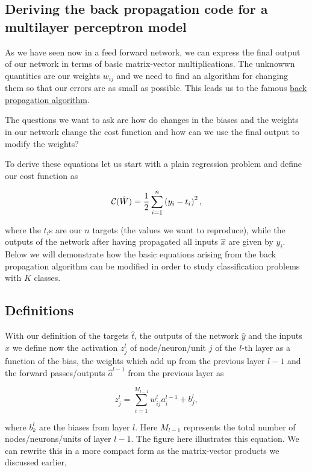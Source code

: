 \documentclass[%
oneside,                 %
final,                   %
10pt]{article}
\begin{document}
\subsection{Deriving the back propagation code for a multilayer perceptron model}

As we have seen now in a feed forward network, we can express the final output of our network in terms of basic matrix-vector multiplications.
The unknowwn quantities are our weights $w_{ij}$ and we need to find an algorithm for changing them so that our errors are as small as possible.
This leads us to the famous \href{{https://www.nature.com/articles/323533a0}}{back propagation algorithm}.

The questions we want to ask are how do changes in the biases and the
weights in our network change the cost function and how can we use the
final output to modify the weights?

To derive these equations let us start with a plain regression problem
and define our cost function as

\[
{\cal C}(\hat{W})  =  \frac{1}{2}\sum_{i=1}^n\left(y_i - t_i\right)^2, 
\]

where the $t_i$s are our $n$ targets (the values we want to
reproduce), while the outputs of the network after having propagated
all inputs $\hat{x}$ are given by $y_i$.  Below we will demonstrate
how the basic equations arising from the back propagation algorithm
can be modified in order to study classification problems with $K$
classes.

\subsection{Definitions}

With our definition of the targets $\hat{t}$, the outputs of the
network $\hat{y}$ and the inputs $\hat{x}$ we
define now the activation $z_j^l$ of node/neuron/unit $j$ of the
$l$-th layer as a function of the bias, the weights which add up from
the previous layer $l-1$ and the forward passes/outputs
$\hat{a}^{l-1}$ from the previous layer as

\[
z_j^l = \sum_{i=1}^{M_{l-1}}w_{ij}^la_i^{l-1}+b_j^l,
\]

where $b_k^l$ are the biases from layer $l$.  Here $M_{l-1}$
represents the total number of nodes/neurons/units of layer $l-1$. The
figure here illustrates this equation.  We can rewrite this in a more
compact form as the matrix-vector products we discussed earlier,
\end{document}
